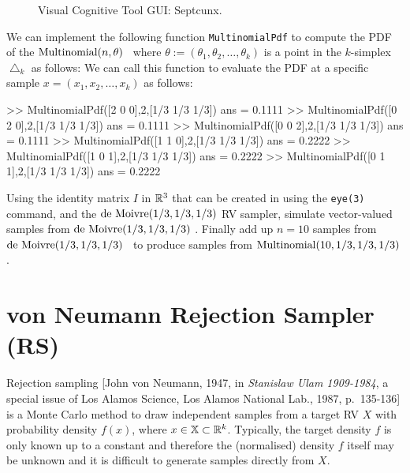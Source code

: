 \begin{figure}[htpb]
\caption{Visual Cognitive Tool GUI: Septcunx.\label{F:guiMultinomialSeptcunx}}
\centering   {}
\end{figure}


\begin{labwork}\label{LW:MultinomialPdf}
We can implement the following \Matlab function {\tt MultinomialPdf} to compute the PDF of the $\mbox{{\rm Multinomial}}(n,\theta)$ \rv~where $\theta:=(\theta_1,\theta_2,\ldots,\theta_k)$ is a point in the $k$-simplex $\bigtriangleup_k$ as follows:
We can call this function to evaluate the PDF at a specific sample $x=(x_1,x_2,\ldots,x_k)$ as follows:
\begin{VrbM}
>> MultinomialPdf([2 0 0],2,[1/3 1/3 1/3])
ans =    0.1111
>> MultinomialPdf([0 2 0],2,[1/3 1/3 1/3])
ans =    0.1111
>> MultinomialPdf([0 0 2],2,[1/3 1/3 1/3])
ans =    0.1111
>> MultinomialPdf([1 1 0],2,[1/3 1/3 1/3])
ans =    0.2222
>> MultinomialPdf([1 0 1],2,[1/3 1/3 1/3])
ans =    0.2222
>> MultinomialPdf([0 1 1],2,[1/3 1/3 1/3])
ans =    0.2222
\end{VrbM}
\end{labwork}

\begin{simulation}\label{SIM:Multinomial}
Using the identity matrix $I$ in $\mathbb{R}^3$ that can be created in \Matlab using the {\tt eye(3)} command, and the $\mbox{{\rm de~Moivre}}(1/3,1/3,1/3)$ RV sampler, simulate vector-valued samples from $\mbox{{\rm de~Moivre}}(1/3,1/3,1/3)$ \rv.  Finally add up $n=10$ samples from $\mbox{{\rm de~Moivre}}(1/3,1/3,1/3)$ \rv~to produce samples from $\mbox{{\rm Multinomial}}(10,1/3,1/3,1/3)$ \rv.
\end{simulation}

\section{von Neumann Rejection Sampler (RS)}\label{S:RS}
Rejection sampling [John von Neumann, 1947, in {\it Stanislaw Ulam 1909-1984}, a special issue of Los Alamos Science, Los Alamos National Lab., 1987, p.~135-136] is a Monte Carlo method to draw independent
samples from a target RV $X$ with probability density $f(x)$, where $x \in \mathbb{X} \subset \mathbb{R}^k$.  Typically, the target density $f$ is only known up to a constant and therefore the (normalised) density $f$ itself may be unknown and it  is difficult to generate samples directly from $X$.

